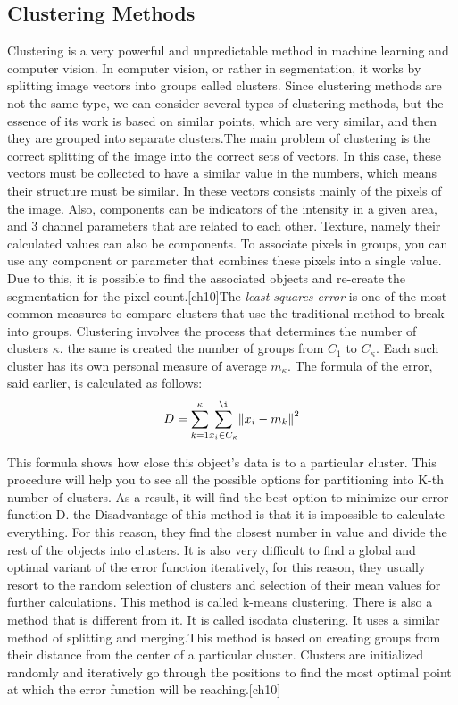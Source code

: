 \subsection{Clustering Methods}\label{sec:3.4.2}
\par  Clustering is a very powerful and unpredictable method in machine learning and computer vision. In computer vision, or rather in segmentation, it works by splitting image vectors into groups called clusters. Since clustering methods are not the same type, we can consider several types of clustering methods, but the essence of its work is based on similar points, which are very similar, and then they are grouped into separate clusters.The main problem of clustering is the correct splitting of the image into the correct sets of vectors. In this case, these vectors must be collected to have a similar value in the numbers, which means their structure must be similar. In these vectors consists mainly of the pixels of the image. Also, components can be indicators of the intensity in a given area, and 3 channel parameters that are related to each other. Texture, namely their calculated values can also be components. To associate pixels in groups, you can use any component or parameter that combines these pixels into a single value. Due to this, it is possible to find the associated objects and re-create the segmentation for the pixel count.[ch10]The\textit{ least squares error} is one of the most common measures to compare clusters that use the traditional method to break into groups. Clustering involves the process that determines the number of clusters $\kappa$. the same is created the number of groups from $C_{1}$ to $C_{\kappa}$. Each such cluster has its own personal measure of average $m_{\kappa}$. The formula of the error, said earlier, is calculated as follows:
\begin{equation}
D = {\sum\limits_{k=1}^{\kappa}} {\sum\limits_{x_i \in{C_{\kappa}}}^{\i}}{\Vert x_i - m_k \Vert}^{2}
\end{equation}

\par This formula shows how close this object's data is to a particular cluster. This procedure will help you to see all the possible options for partitioning into K-th number of clusters. As a result, it will find the best option to minimize our error function D. the Disadvantage of this method is that it is impossible to calculate everything. For this reason, they find the closest number in value and divide the rest of the objects into clusters. It is also very difficult to find a global and optimal variant of the error function iteratively, for this reason, they usually resort to the random selection of clusters and selection of their mean values for further calculations. This method is called k-means clustering. There is also a method that is different from it. It is called isodata clustering. It uses a similar method of splitting and merging.This method is based on creating groups from their distance from the center of a particular cluster. Clusters are initialized randomly and iteratively go through the positions to find the most optimal point at which the error function will be reaching.[ch10]

